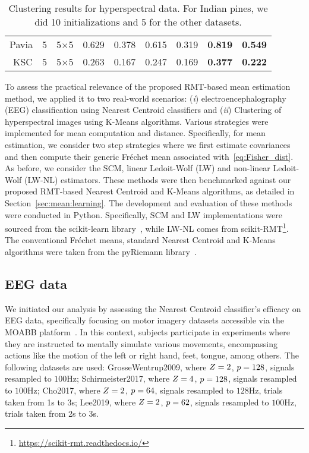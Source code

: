 \documentclass{article}
\theoremstyle{plain}
\theoremstyle{definition}
\theoremstyle{remark}
\begin{document}
\begin{table*}[t]
\begin{tabular}{rcccccccc}
Pavia                         & 5             & 5$\times$5            & 0.629           & 0.378 & 0.615        & 0.319       & \textbf{0.819} & \textbf{0.549} \\ \cline{2-9} 
KSC                           & 5             & 5$\times$5   & 0.263           & 0.167 & 0.247        & 0.169       & \textbf{0.377} & \textbf{0.222}
\end{tabular}
\caption{Clustering results for hyperspectral data. For Indian pines, we did 10 initializations and 5 for the other datasets.}
\label{tab:hyperspectral}
\end{table*}

To assess the practical relevance of the proposed RMT-based mean estimation method, we applied it to two real-world scenarios:
(\emph{i}) electroencephalography (EEG) classification using Nearest Centroid classifiers and (\emph{ii}) Clustering of hyperspectral images using K-Means algorithms.
Various strategies were implemented for mean computation and distance. Specifically, for mean estimation, we consider two step strategies where we first estimate covariances and then compute their generic Fréchet mean associated with~\eqref{eq:Fisher_dist}.
As before, we consider the SCM, linear Ledoit-Wolf (LW) and non-linear Ledoit-Wolf (LW-NL) estimators.
These methods were then benchmarked against our proposed RMT-based Nearest Centroid and K-Means algorithms, as detailed in Section~\ref{sec:mean:learning}. The development and evaluation of these methods were conducted in Python. Specifically, SCM and LW implementations were sourced from the scikit-learn library~\cite{pedregosa2018scikitlearn}, while LW-NL comes from scikit-RMT\footnote{\url{https://scikit-rmt.readthedocs.io/}}. The conventional Fréchet means, standard Nearest Centroid and K-Means algorithms were taken from the pyRiemann library~\cite{alexandre_barachant_2023_8059038}.


\subsection{EEG data}

We initiated our analysis by assessing the Nearest Centroid classifier's efficacy on EEG data, specifically focusing on motor imagery datasets accessible via the MOABB platform~\cite{Aristimunha_Mother_of_all_2023}.
In this context, subjects participate in experiments where they are instructed to mentally simulate various movements, encompassing actions like the motion of the left or right hand, feet, tongue, among others.
The following datasets are used:
GrosseWentrup2009, where $Z=2$, $p=128$, signals resampled to $100$Hz;
Schirmeister2017, where  $Z=4$, $p=128$, signals resampled to $100$Hz;
Cho2017, where  $Z=2$, $p=64$, signals resampled to $128$Hz, trials taken from 1s to 3s;
Lee2019, where  $Z=2$, $p=62$, signals resampled to $100$Hz, trials taken from 2s to 3s.
\end{document}
